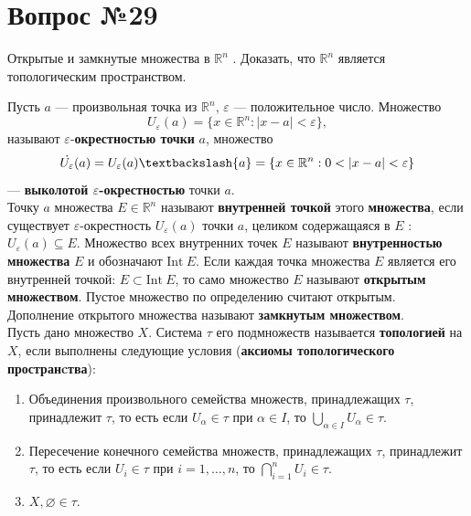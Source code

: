 \documentclass[12pt]{report}
\numberwithin{equation}{section}
\begin{document}
\newpage \section{Вопрос №29} %
\begin{framed}
Открытые и замкнутые множества в $\mathbb{R}^n$ . Доказать, что $\mathbb{R}^n$ является топологическим пространством.
\end{framed}

Пусть $a$ --- произвольная точка из $\mathbb{R}^n$, $\varepsilon$ --- положительное число. Множество
\[ U_{\varepsilon} (a) = \{ x \in \mathbb{R}^n : | x- a| < \varepsilon \}, \]
называют $\varepsilon$-\textbf{окрестностью точки} $a$, множество
\[ \dot{U_{\varepsilon}}(a) = U_{\varepsilon}(a) \textbackslash \{ a \} = \{ x \in \mathbb{R}^n : 0 < | x - a | < \varepsilon\}\]
--- \textbf{выколотой $\varepsilon$-окрестностью} точки $a$.\\

Точку $a$ множества $E \in \mathbb{R}^n$ называют \textbf{внутренней точкой} этого \textbf{множества}, если существует $\varepsilon$-окрестность $U_{\varepsilon}(a)$ точки $a$, целиком содержащаяся в $E$ : $U_{\varepsilon}(a) \subseteq E$. Множество всех внутренних точек $E$ называют \textbf{внутренностью множества} $E$ и обозначают $\mathrm{Int}~E$. Если каждая точка множества $E$ является его внутренней точкой: $E \subset \mathrm{Int}~E$, то само множество $E$ называют \textbf{открытым множеством}. Пустое множество по определению считают открытым.\\

Дополнение открытого множества называют \textbf{замкнутым множеством}.\\

Пусть дано множество $X$. Система $\tau$ его подмножеств называется \textbf{топологией} на $X$, если выполнены следующие условия (\textbf{аксиомы топологического пространcтва}):
\begin{enumerate}
\item Объединения произвольного семейства множеств, принадлежащих $\tau$, принадлежит $\tau$, то есть если $U_{\alpha} \in \tau$ при $\alpha \in I$, то $\bigcup\limits_{\alpha \in I} U_{\alpha} \in \tau$. \label{ax:29:1}
\item Пересечение конечного семейства множеств, принадлежащих $\tau$, принадлежит $\tau$, то есть если $U_i \in \tau$ при $i = 1, \ldots, n$, то $\bigcap\limits_{i = 1}^n U_i \in \tau$. \label{ax:29:2}
\item $X, \varnothing \in \tau$. \label{ax:29:3}
\end{enumerate}
\end{document}
